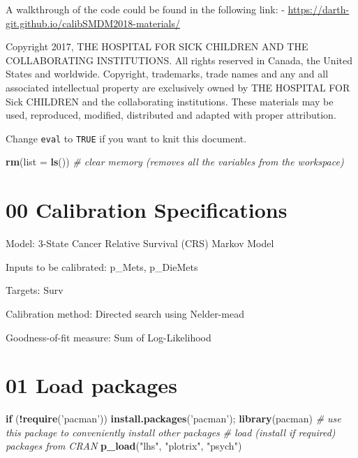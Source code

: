 \documentclass[
]{article}
\newenvironment{Shaded}{\begin{snugshade}}{\end{snugshade}}
\newcommand{\CommentTok}[1]{\textcolor[rgb]{0.56,0.35,0.01}{\textit{#1}}}
\newcommand{\ControlFlowTok}[1]{\textcolor[rgb]{0.13,0.29,0.53}{\textbf{#1}}}
\newcommand{\DataTypeTok}[1]{\textcolor[rgb]{0.13,0.29,0.53}{#1}}
\newcommand{\KeywordTok}[1]{\textcolor[rgb]{0.13,0.29,0.53}{\textbf{#1}}}
\newcommand{\NormalTok}[1]{#1}
\newcommand{\OperatorTok}[1]{\textcolor[rgb]{0.81,0.36,0.00}{\textbf{#1}}}
\newcommand{\StringTok}[1]{\textcolor[rgb]{0.31,0.60,0.02}{#1}}
\begin{document}
A walkthrough of the code could be found in the following link: -
\url{https://darth-git.github.io/calibSMDM2018-materials/}

Copyright 2017, THE HOSPITAL FOR SICK CHILDREN AND THE COLLABORATING
INSTITUTIONS. All rights reserved in Canada, the United States and
worldwide. Copyright, trademarks, trade names and any and all associated
intellectual property are exclusively owned by THE HOSPITAL FOR Sick
CHILDREN and the collaborating institutions. These materials may be
used, reproduced, modified, distributed and adapted with proper
attribution.

\newpage

Change \texttt{eval} to \texttt{TRUE} if you want to knit this document.

\begin{Shaded}
\begin{Highlighting}[]
\KeywordTok{rm}\NormalTok{(}\DataTypeTok{list =} \KeywordTok{ls}\NormalTok{())      }\CommentTok{# clear memory (removes all the variables from the workspace)}
\end{Highlighting}
\end{Shaded}

\hypertarget{calibration-specifications}{%
\section{00 Calibration
Specifications}\label{calibration-specifications}}

Model: 3-State Cancer Relative Survival (CRS) Markov Model

Inputs to be calibrated: p\_Mets, p\_DieMets

Targets: Surv

Calibration method: Directed search using Nelder-mead

Goodness-of-fit measure: Sum of Log-Likelihood

\hypertarget{load-packages}{%
\section{01 Load packages}\label{load-packages}}

\begin{Shaded}
\begin{Highlighting}[]
\ControlFlowTok{if}\NormalTok{ (}\OperatorTok{!}\KeywordTok{require}\NormalTok{(}\StringTok{'pacman'}\NormalTok{)) }\KeywordTok{install.packages}\NormalTok{(}\StringTok{'pacman'}\NormalTok{); }\KeywordTok{library}\NormalTok{(pacman) }\CommentTok{# use this package to conveniently install other packages}
\CommentTok{# load (install if required) packages from CRAN}
\KeywordTok{p_load}\NormalTok{(}\StringTok{"lhs"}\NormalTok{, }\StringTok{"plotrix"}\NormalTok{, }\StringTok{"psych"}\NormalTok{)}
\end{Highlighting}
\end{Shaded}
\end{document}
